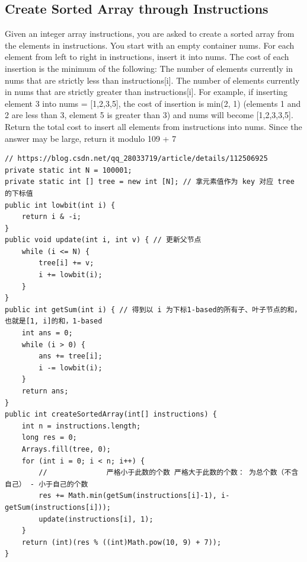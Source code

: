 \documentclass[9pt, b5paaper]{book}
\begin{document}
\subsection{Create Sorted Array through Instructions}
\label{sec-3-0-8}
Given an integer array instructions, you are asked to create a sorted array from the elements in instructions. You start with an empty container nums. For each element from left to right in instructions, insert it into nums. The cost of each insertion is the minimum of the following:
The number of elements currently in nums that are strictly less than instructions[i].
The number of elements currently in nums that are strictly greater than instructions[i].
For example, if inserting element 3 into nums = [1,2,3,5], the cost of insertion is min(2, 1) (elements 1 and 2 are less than 3, element 5 is greater than 3) and nums will become [1,2,3,3,5].
Return the total cost to insert all elements from instructions into nums. Since the answer may be large, return it modulo 109 + 7
\begin{verbatim}
// https://blog.csdn.net/qq_28033719/article/details/112506925
private static int N = 100001;
private static int [] tree = new int [N]; // 拿元素值作为 key 对应 tree 的下标值
public int lowbit(int i) {
    return i & -i;
}
public void update(int i, int v) { // 更新父节点
    while (i <= N) {
        tree[i] += v;
        i += lowbit(i);
    }
}
public int getSum(int i) { // 得到以 i 为下标1-based的所有子、叶子节点的和， 也就是[1, i]的和，1-based
    int ans = 0;
    while (i > 0) {
        ans += tree[i];
        i -= lowbit(i);
    }
    return ans;
}
public int createSortedArray(int[] instructions) {
    int n = instructions.length;
    long res = 0;
    Arrays.fill(tree, 0);
    for (int i = 0; i < n; i++) {
        //              严格小于此数的个数 严格大于此数的个数： 为总个数（不含自己） - 小于自己的个数
        res += Math.min(getSum(instructions[i]-1), i-getSum(instructions[i])); 
        update(instructions[i], 1);
    }
    return (int)(res % ((int)Math.pow(10, 9) + 7));
}
\end{verbatim}
\end{document}
